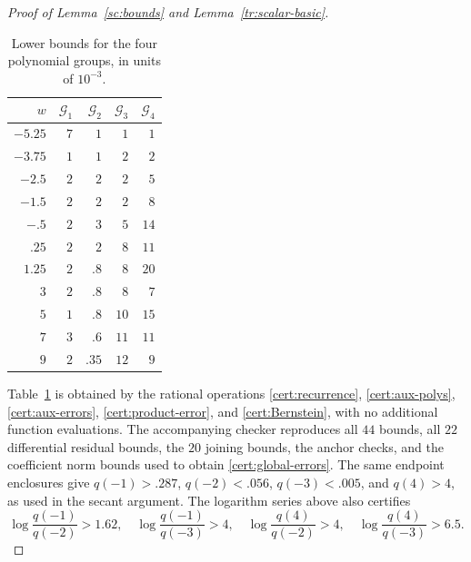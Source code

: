 \documentclass[11pt]{article}
\theoremstyle{definition}
\theoremstyle{remark}
\numberwithin{equation}{section}
\begin{document}
\begin{proof}[Proof of Lemma~\ref{sc:bounds} and Lemma~\ref{tr:scalar-basic}]
\begin{table}[htbp]
\centering
\caption{Lower bounds for the four polynomial groups, in units of $10^{-3}$.}
\label{cert:group-bounds}
\begin{tabular}{r r r r r}
\hline
$w$&$\mathcal G_1$&$\mathcal G_2$&$\mathcal G_3$&$\mathcal G_4$\\\hline
$-5.25$&$7$&$1$&$1$&$1$\\
$-3.75$&$1$&$1$&$2$&$2$\\
$-2.5$&$2$&$2$&$2$&$5$\\
$-1.5$&$2$&$2$&$2$&$8$\\
$-.5$&$2$&$3$&$5$&$14$\\
$.25$&$2$&$2$&$8$&$11$\\
$1.25$&$2$&$.8$&$8$&$20$\\
$3$&$2$&$.8$&$8$&$7$\\
$5$&$1$&$.8$&$10$&$15$\\
$7$&$3$&$.6$&$11$&$11$\\
$9$&$2$&$.35$&$12$&$9$\\\hline
\end{tabular}
\end{table}

Table~\ref{cert:group-bounds} is obtained by the rational operations
\eqref{cert:recurrence}, \eqref{cert:aux-polys},
\eqref{cert:aux-errors}, \eqref{cert:product-error}, and
\eqref{cert:Bernstein}, with no additional function evaluations.
The accompanying checker reproduces all $44$ bounds, all $22$
differential residual bounds, the $20$ joining bounds, the anchor checks,
and the coefficient norm bounds used to obtain
\eqref{cert:global-errors}. The same endpoint enclosures give
$q(-1)>.287$, $q(-2)<.056$, $q(-3)<.005$, and $q(4)>4$, as used
in the secant argument. The logarithm series above also certifies
\[
 \log\frac{q(-1)}{q(-2)}>1.62,\quad
 \log\frac{q(-1)}{q(-3)}>4,\quad
 \log\frac{q(4)}{q(-2)}>4,\quad
 \log\frac{q(4)}{q(-3)}>6.5.
\]


\end{proof}
\end{document}
